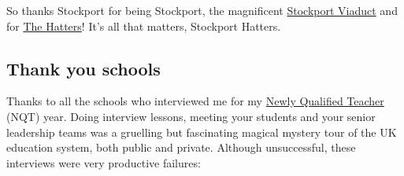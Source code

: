 \documentclass[
]{book}
\begin{document}
So thanks Stockport for being Stockport, the magnificent \href{https://en.wikipedia.org/wiki/Stockport_Viaduct}{Stockport Viaduct} and for \href{https://en.wikipedia.org/wiki/Stockport_County_F.C.}{The Hatters}! It's all that matters, Stockport Hatters. 🙏

\hypertarget{schools}{%
\subsection{Thank you schools}\label{schools}}

Thanks to all the schools who interviewed me for my \href{https://en.wikipedia.org/wiki/Newly_qualified_teacher}{Newly Qualified Teacher} (NQT) year. Doing interview lessons, meeting your students and your senior leadership teams was a gruelling but fascinating magical mystery tour of the UK education system, both public and private. Although unsuccessful, these interviews were very productive failures:
\end{document}
